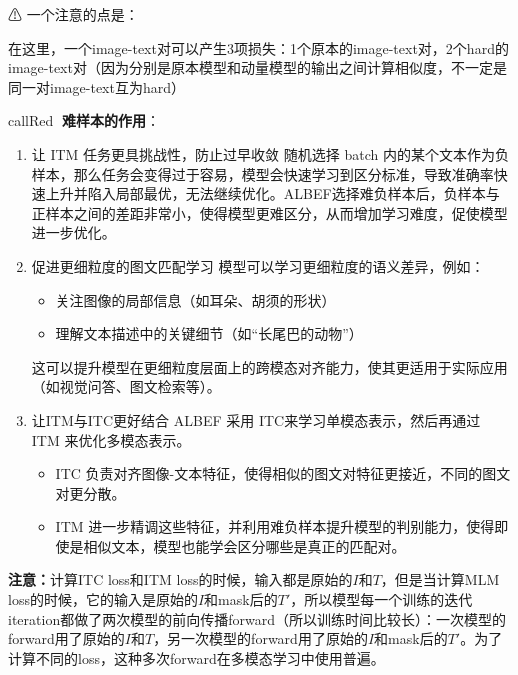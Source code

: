 \documentclass[zihao=false,fontset=windows]{ctexart}
\newcommand{\feiEmoji}[1]{{\emojifont #1}}
\begin{document}
\vspace{0.45em}
\feiEmoji{⚠} 一个注意的点是：\par
在这里，一个image-text对可以产生3项损失：1个原本的image-text对，2个hard的image-text对（因为分别是原本模型和动量模型的输出之间计算相似度，不一定是同一对image-text互为hard）\par
\vspace{0.45em}
\begin{feishubox}{callRed}{🙋}
\textbf{难样本的作用}：\par
\begin{enumerate}
\item 让 ITM 任务更具挑战性，防止过早收敛
\textcolor{feishuGray2}{随机选择 batch 内的某个文本作为负样本，那么任务会变得过于容易，模型会快速学习到区分标准，导致准确率快速上升并陷入局部最优，无法继续优化。ALBEF选择难负样本后，负样本与正样本之间的差距非常小，使得模型更难区分，从而增加学习难度，促使模型进一步优化。}\par
\item 促进更细粒度的图文匹配学习
\textcolor{feishuGray2}{模型可以学习更细粒度的语义差异，例如：}\par
\begin{itemize}
\item \textcolor{feishuGray2}{关注图像的局部信息（如耳朵、胡须的形状）}
\item \textcolor{feishuGray2}{理解文本描述中的关键细节（如“长尾巴的动物”）}
\end{itemize}
\textcolor{feishuGray2}{这可以提升模型在更细粒度层面上的跨模态对齐能力，使其更适用于实际应用（如视觉问答、图文检索等）。}\par
\item 让ITM与ITC更好结合
\textcolor{feishuGray2}{ALBEF 采用 ITC来学习单模态表示，然后再通过 ITM 来优化多模态表示。}\par
\begin{itemize}
\item \textcolor{feishuGray2}{ITC 负责对齐图像-文本特征，使得相似的图文对特征更接近，不同的图文对更分散。}
\item \textcolor{feishuGray2}{ITM 进一步精调这些特征，并利用难负样本提升模型的判别能力，使得即使是相似文本，模型也能学会区分哪些是真正的匹配对。}
\end{itemize}
\end{enumerate}
\end{feishubox}
\vspace{0.45em}
\textbf{注意：}计算ITC loss和ITM loss的时候，输入都是原始的$I$和$T$，但是当计算MLM loss的时候，它的输入是原始的$I$和mask后的$T'$，所以模型每一个训练的迭代iteration都做了两次模型的前向传播forward（所以训练时间比较长）：一次模型的forward用了原始的$I$和$T$，另一次模型的forward用了原始的$I$和mask后的$T'$。为了计算不同的loss，这种多次forward在多模态学习中使用普遍。\par
\end{document}
